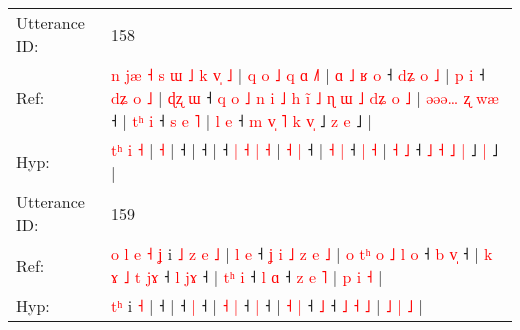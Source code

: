 \documentclass[10pt]{article}
\DeclareRobustCommand{\hl}[1]{{\textcolor{red}{#1}}}
\begin{document}
\begin{longtable}{ll}
 \\
\midrule
Utterance ID: & 158 \\
Ref: & \hl{n}\hl{ }\hl{j}\hl{æ}\hl{ }\hl{˧}\hl{ }\hl{s}\hl{ }\hl{ɯ}\hl{ }\hl{˩}\hl{ }\hl{k} \hl{v}\hl{̩} \hl{˩} |\hl{ }\hl{q}\hl{ }\hl{o}\hl{ }\hl{˩}\hl{ }\hl{q}\hl{ }\hl{ɑ} \hl{˩}\hl{˥} |\hl{ }\hl{ɑ}\hl{ }\hl{˩}\hl{ }\hl{ʁ}\hl{ }\hl{o} ˧\hl{ }\hl{d}\hl{ʑ}\hl{ }\hl{o}\hl{ }\hl{˩} |\hl{ }\hl{p}\hl{ }\hl{i} ˧\hl{ }\hl{d}\hl{ʑ}\hl{ }\hl{o}\hl{ }\hl{˩} |\hl{ }\hl{ɖ}\hl{ʐ}\hl{ }\hl{ɯ} ˧\hl{ }\hl{q}\hl{ }\hl{o}\hl{ }\hl{˩}\hl{ }\hl{n}\hl{ }\hl{i}\hl{ }\hl{˩}\hl{ }\hl{h}\hl{ }\hl{i}\hl{̃}\hl{ }\hl{˩}\hl{ }\hl{ɳ}\hl{ }\hl{ɯ} \hl{˩} \hl{d}\hl{ʑ} \hl{o} \hl{˩} |\hl{ }\hl{ə}\hl{ə}\hl{ə}\hl{…} \hl{ʐ} \hl{w}\hl{æ} ˧ | \hl{t}\hl{ʰ} \hl{i} ˧\hl{ }\hl{s} \hl{e} \hl{˥} | \hl{l} \hl{e} ˧\hl{ }\hl{m} \hl{v}\hl{̩} \hl{˥} \hl{k} \hl{v}\hl{̩} ˩\hl{ }\hl{z} \hl{e} ˩ |
 \\
Hyp: & \hl{}\hl{}\hl{}\hl{}\hl{}\hl{}\hl{}\hl{}\hl{}\hl{}\hl{}\hl{}\hl{t}\hl{ʰ} \hl{}\hl{i} \hl{˧} |\hl{}\hl{}\hl{}\hl{}\hl{}\hl{}\hl{}\hl{}\hl{}\hl{} \hl{}\hl{˧} |\hl{}\hl{}\hl{}\hl{}\hl{}\hl{}\hl{}\hl{} ˧\hl{}\hl{}\hl{}\hl{}\hl{}\hl{}\hl{} |\hl{}\hl{}\hl{}\hl{} ˧\hl{}\hl{}\hl{}\hl{}\hl{}\hl{}\hl{} |\hl{}\hl{}\hl{}\hl{}\hl{} ˧\hl{}\hl{}\hl{}\hl{}\hl{}\hl{}\hl{}\hl{}\hl{}\hl{}\hl{}\hl{}\hl{}\hl{}\hl{}\hl{}\hl{}\hl{}\hl{}\hl{}\hl{}\hl{}\hl{} \hl{|} \hl{}\hl{˧} \hl{|} \hl{˧} |\hl{}\hl{}\hl{}\hl{}\hl{} \hl{˧} \hl{}\hl{|} ˧ | \hl{}\hl{˧} \hl{|} ˧\hl{}\hl{} \hl{|} \hl{˧} | \hl{˧} \hl{˩} ˧\hl{}\hl{} \hl{}\hl{˩} \hl{˧} \hl{˩} \hl{}\hl{|} ˩\hl{}\hl{} \hl{|} ˩ |
 \\
\midrule
Utterance ID: & 159 \\
Ref: & \hl{o}\hl{ }\hl{l}\hl{ }\hl{e}\hl{ }\hl{˧}\hl{ }\hl{ʝ} i\hl{ }\hl{˩}\hl{ }\hl{z}\hl{ }\hl{e} \hl{˩} |\hl{ }\hl{l}\hl{ }\hl{e} ˧\hl{ }\hl{ʝ}\hl{ }\hl{i}\hl{ }\hl{˩}\hl{ }\hl{z}\hl{ }\hl{e}\hl{ }\hl{˩} |\hl{ }\hl{o}\hl{ }\hl{t}\hl{ʰ}\hl{ }\hl{o}\hl{ }\hl{˩}\hl{ }\hl{l}\hl{ }\hl{o} ˧\hl{ }\hl{b} \hl{v}\hl{̩} ˧ |\hl{ }\hl{k}\hl{ }\hl{ɤ}\hl{ }\hl{˩} \hl{t} \hl{j}\hl{ɤ} ˧\hl{ }\hl{l} \hl{j}\hl{ɤ} ˧ | \hl{t}\hl{ʰ} \hl{i} ˧\hl{ }\hl{l} \hl{ɑ} ˧ \hl{z} \hl{e} \hl{˥} | \hl{p} \hl{i} \hl{˧} |
 \\
Hyp: & \hl{}\hl{}\hl{}\hl{}\hl{}\hl{}\hl{}\hl{t}\hl{ʰ} i\hl{}\hl{}\hl{}\hl{}\hl{}\hl{} \hl{˧} |\hl{}\hl{}\hl{}\hl{} ˧\hl{}\hl{}\hl{}\hl{}\hl{}\hl{}\hl{}\hl{}\hl{}\hl{}\hl{}\hl{} |\hl{}\hl{}\hl{}\hl{}\hl{}\hl{}\hl{}\hl{}\hl{}\hl{}\hl{}\hl{}\hl{} ˧\hl{}\hl{} \hl{}\hl{|} ˧ |\hl{}\hl{}\hl{}\hl{}\hl{}\hl{} \hl{˧} \hl{}\hl{|} ˧\hl{}\hl{} \hl{}\hl{|} ˧ | \hl{}\hl{˧} \hl{|} ˧\hl{}\hl{} \hl{˩} ˧ \hl{˩} \hl{˧} \hl{˩} | \hl{˩} \hl{|} \hl{˩} |

\end{longtable}
\end{document}
